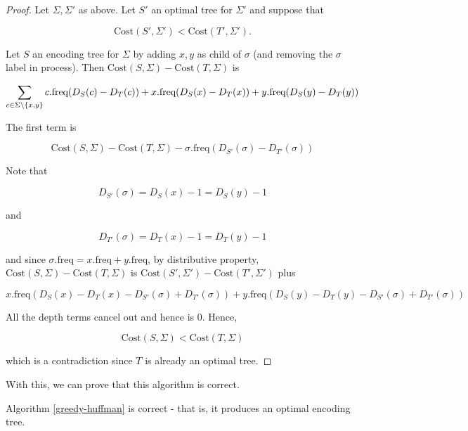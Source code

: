 \begin{proof}
    Let $\Sigma, \Sigma'$ as above. Let $S'$ an optimal tree for $\Sigma'$ and suppose that 

    \[
        \text{Cost}(S',\Sigma')<\text{Cost}(T',\Sigma'). 
    \]

    Let $S$ an encoding tree for $\Sigma$ by adding $x, y$ as child of $\sigma$ (and removing the $\sigma$ label in process). 
    Then $\text{Cost}(S,\Sigma)-\text{Cost}(T,\Sigma)$ is 

    \[
        \sum_{c \in \Sigma \setminus \cbr{x, y}} c.\text{freq}(D_S(c)-D_T(c)) + x.\text{freq}(D_S(x)-D_T(x))+y.\text{freq}(D_S(y)-D_T(y))
    \]

    The first term is 

    \[
        \text{Cost}(S,\Sigma)-\text{Cost}(T,\Sigma) - \sigma.\text{freq}(D_{S'}(\sigma) - D_{T'}(\sigma)) 
    \]

    Note that 

    \[
        D_{S'}(\sigma) = D_{S}(x) - 1 = D_{S}(y) - 1
    \]

    and 

    \[
        D_{T'}(\sigma) = D_{T}(x) - 1 = D_{T}(y) - 1
    \]

    and since $\sigma.\text{freq} = x.\text{freq} + y.\text{freq}$, by distributive property, $\text{Cost}(S,\Sigma)-\text{Cost}(T,\Sigma)$ is $\text{Cost}(S',\Sigma')-\text{Cost}(T',\Sigma')$ plus

    \[
        x.\text{freq}(D_S(x)-D_T(x) - D_{S'}(\sigma) + D_{T'}(\sigma)) +y.\text{freq}(D_S(y)-D_T(y)-D_{S'}(\sigma) + D_{T'}(\sigma))
    \]

    All the depth terms cancel out and hence is $0$. Hence, 

    \[
        \text{Cost}(S,\Sigma)< \text{Cost}(T,\Sigma)
    \]

    which is a contradiction since $T$ is already an optimal tree. 
\end{proof}

With this, we can prove that this algorithm is correct.

\begin{theorem}
    Algorithm \ref{greedy-huffman} is correct - that is, it produces an optimal encoding tree. 
\end{theorem}

